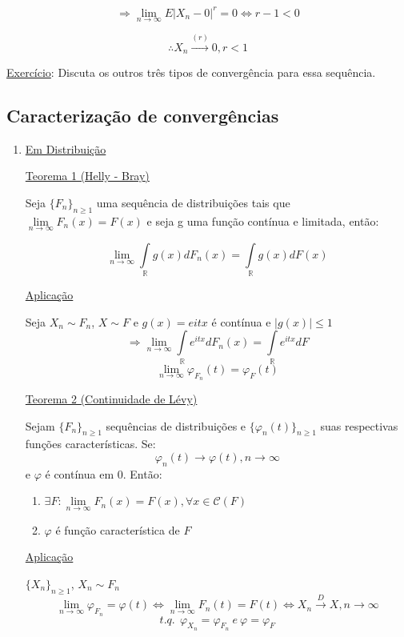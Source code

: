 \documentclass[a4paper,12pt]{article}
\begin{document}
$$
\Rightarrow \lim\limits_{n\rightarrow \infty}  E|X_n-0|^r = 0 \Leftrightarrow r-1<0
$$

$$\therefore X_n \overset{(r)}{\longrightarrow}0, r<1  $$

\underline{Exercício}: Discuta os outros três tipos de convergência para essa sequência.

\subsection{Caracterização de convergências}

\begin{enumerate}[label =\arabic*)]
	\item \underline{Em Distribuição}
	
	\underline{Teorema 1 (Helly - Bray) }
	
	Seja $\{F_n\}_{n\ge 1}$ uma sequência de distribuições tais que $\lim\limits_{n\rightarrow \infty}  F_n(x)=F(x)$ e seja g uma função contínua e limitada, então:
	
	$$\lim\limits_{n\rightarrow \infty} \int\limits_{\mathbb R} g(x)dF_n(x)  = \int\limits_{\mathbb R} g(x) dF(x)$$
	
	\underline{Aplicação}
	
	Seja $X_n\sim F_n$, $X\sim F$ e $g(x)=e{itx}$ é contínua e $|g(x)|\le 1$
	$$\Rightarrow \lim\limits_{n\rightarrow \infty}  \int\limits_{\mathbb R} e^{itx}dF_n(x) = \int\limits_{\mathbb R} e^{itx}dF $$
	$$\lim\limits_{n\rightarrow \infty} \varphi_{F_n}(t) = \varphi_F(t) $$
	\newpage 
	
	\underline{Teorema 2 (Continuidade de Lévy)}
	
		Sejam $\{F_n\}_{n\ge 1}$ sequências de distribuições e  $\{\varphi_n(t)\}_{n\ge 1}$ suas respectivas funções características. Se:
		$$\varphi_n (t) \longrightarrow \varphi (t), n \rightarrow \infty$$
		e $\varphi$ é contínua em 0. Então: 
		\begin{enumerate}[label = \alph*)]
			\item $\exists F: \lim\limits_{n\rightarrow \infty} F_n(x) = F(x), \forall x\in \mathscr C(F)$
			\item $\varphi$ é função característica de $F$
		\end{enumerate}
	
	\underline{Aplicação}
	
	$\{X_n\}_{n\ge 1} $, $X_n \sim F_n$
	$$\lim\limits_{n\rightarrow \infty}  \varphi_{F_n} = \varphi(t) \Leftrightarrow \lim\limits_{n\rightarrow \infty} F_n(t) = F(t)
	\Leftrightarrow X_n \overset{D}{\longrightarrow}  X, n\rightarrow \infty
	 $$
		$$t.q. \ \  \varphi_{X_n} = \varphi_{F_n} \ e \ \varphi = \varphi_F$$
		

\end{enumerate}
\end{document}
